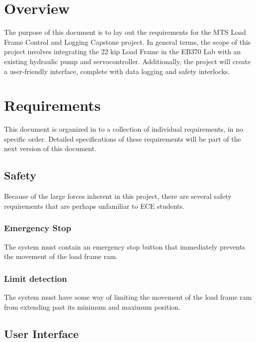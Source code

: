 \documentclass{article}
\begin{document}
\newpage


\section{Overview}

The purpose of this document is to lay out the requirements for the
MTS Load Frame Control and Logging Capstone project. In general terms,
the scope of this project involves integrating the 22 kip Load Frame
in the EB370 Lab with an existing hydraulic pump and
servocontroller. Additionally, the project will create a user-friendly
interface, complete with data logging and safety interlocks. 

\newpage

\tableofcontents

\newpage

\section{Requirements}

This document is organized in to a collection of individual
requirements, in no specific order. Detailed specifications of these
requirements will be part of the next version of this document. 

\subsection{Safety}
Because of the large forces inherent in this project, there are
several safety requirements that are perhaps unfamiliar to ECE
students. 

\subsubsection{Emergency Stop} 
The system must contain an emergency stop button that immediately
prevents the movement of the load frame ram. 

\subsubsection{Limit detection}
The system must have some way of limiting the movement of the load
frame ram from extending past its minimum and maximum position. 

\subsection{User Interface}
\end{document}
